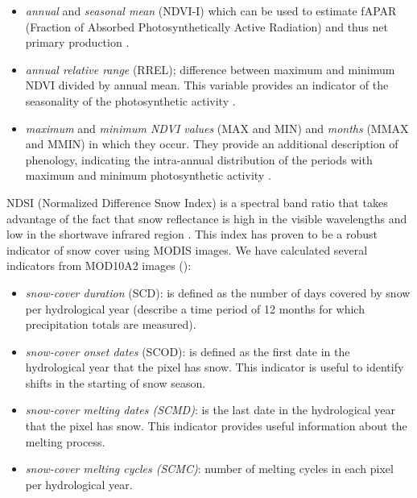 \begin{itemize}
\item
  \textit{annual} and \textit{seasonal mean} (NDVI-I) which can be used to estimate fAPAR (Fraction of Absorbed Photosynthetically Active Radiation) \autocite{Sellersetal1996RevisedLand} and thus net primary production \autocite{Parueloetal1997ANPPEstimates,Sellersetal1992CanopyReflectance,Tuckeretal1985AfricanLandCover}.
\item
  \textit{annual relative range} (RREL); difference between maximum and minimum NDVI divided by annual mean. This variable provides an indicator of the seasonality of the photosynthetic activity \autocite{ParueloLauenroth1995RegionalPatterns}.
\item
  \textit{maximum} and \textit{minimum NDVI values} (MAX and MIN) and \textit{months} (MMAX and MMIN) in which they occur. They provide an additional description of phenology, indicating the intra-annual distribution of the periods with maximum and minimum photosynthetic activity \autocite{HoareFrost2004PhenologicalDescription,Lloyd1990PhenologicalClassification}.
\end{itemize}

NDSI (Normalized Difference Snow Index) is a spectral band ratio that takes advantage of the fact that snow reflectance is high in the visible wavelengths and low in the shortwave infrared region \autocite{SalomonsonAppel2006DevelopmentAqua}. This index has proven to be a robust indicator of snow cover using MODIS images\autocite{Rittgeretal2013AssessmentMethods}. We have calculated several indicators from MOD10A2 images \autocite{WangXie2009NewMethods} ():

\begin{itemize}
\item
  \textit{snow-cover duration} (SCD): is defined as the number of days covered by snow per hydrological year (describe a time period of 12 months for which precipitation totals are measured).
\item
  \textit{snow-cover onset dates} (SCOD): is defined as the first date in the hydrological year that the pixel has snow. This indicator is useful to identify shifts in the starting of snow season.
\item
  \textit{snow-cover melting dates (SCMD)}: is the last date in the hydrological year that the pixel has snow. This indicator provides useful information about the melting process.
\item
  \textit{snow-cover melting cycles (SCMC)}: number of melting cycles in each pixel per hydrological year.
\end{itemize}

